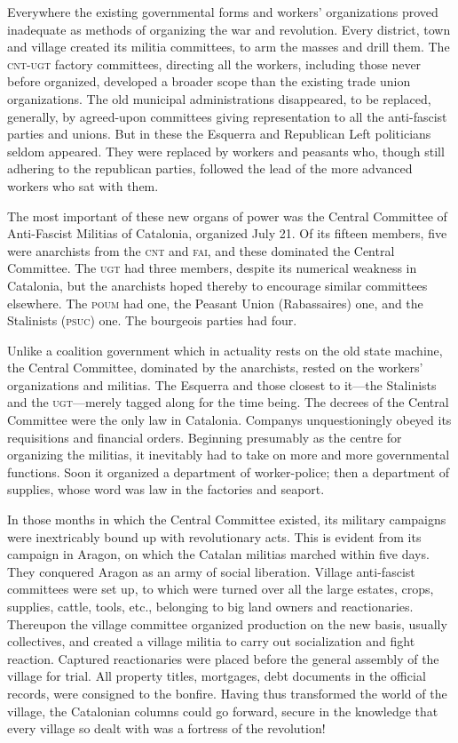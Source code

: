 Everywhere the existing governmental forms and workers’ organizations proved inadequate as methods of organizing the war and revolution. Every district, town and village created its militia committees, to arm the masses and drill them. The \textsc{cnt-ugt} factory committees, directing all the workers, including those never before organized, developed a broader scope than the existing trade union organizations. The old municipal administrations disappeared, to be replaced, generally, by agreed-upon committees giving representation to all the anti-fascist parties and unions. But in these the Esquerra and Republican Left politicians seldom appeared. They were replaced by workers and peasants who, though still adhering to the republican parties, followed the lead of the more advanced workers who sat with them.

The most important of these new organs of power was the Central Committee of Anti-Fascist Militias of Catalonia, organized July 21. Of its fifteen members, five were anarchists from the \textsc{cnt} and \textsc{fai}, and these dominated the Central Committee. The \textsc{ugt} had three members, despite its numerical weakness in Catalonia, but the anarchists hoped thereby to encourage similar committees elsewhere. The \textsc{poum} had one, the Peasant Union (Rabassaires) one, and the Stalinists (\textsc{psuc}) one. The bourgeois parties had four.

Unlike a coalition government which in actuality rests on the old state machine, the Central Committee, dominated by the anarchists, rested on the workers’ organizations and militias. The Esquerra and those closest to it---the Stalinists and the \textsc{ugt}---merely tagged along for the time being. The decrees of the Central Committee were the only law in Catalonia. Companys unquestioningly obeyed its requisitions and financial orders. Beginning presumably as the centre for organizing the militias, it inevitably had to take on more and more governmental functions. Soon it organized a department of worker-police; then a department of supplies, whose word was law in the factories and seaport.

In those months in which the Central Committee existed, its military campaigns were inextricably bound up with revolutionary acts. This is evident from its campaign in Aragon, on which the Catalan militias marched within five days. They conquered Aragon as an army of social liberation. Village anti-fascist committees were set up, to which were turned over all the large estates, crops, supplies, cattle, tools, etc., belonging to big land owners and reactionaries. Thereupon the village committee organized production on the new basis, usually collectives, and created a village militia to carry out socialization and fight reaction. Captured reactionaries were placed before the general assembly of the village for trial. All property titles, mortgages, debt documents in the official records, were consigned to the bonfire. Having thus transformed the world of the village, the Catalonian columns could go forward, secure in the knowledge that every village so dealt with was a fortress of the revolution!


